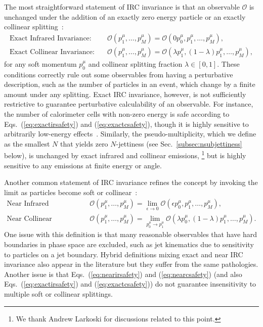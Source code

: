 \documentclass[letterpaper,11pt]{article}
\DeclareRobustCommand{\Sec}[1]{Sec.~\ref{#1}}
\DeclareRobustCommand{\Eqs}[2]{Eqs.~(\ref{#1}) and (\ref{#2})}
\begin{document}
The most straightforward statement of IRC invariance is that an observable $\mathcal O$ is unchanged under the addition of an exactly zero energy particle or an exactly collinear splitting~\cite{sterman1995handbook}:
%
\begin{align}
\label{eq:exactirsafety}\text{Exact Infrared Invariance:}&\quad \mathcal O(p_1^\mu, \ldots,p_M^\mu) =  \mathcal O(0 p_0^\mu, p_1^\mu,  \ldots, p_M^\mu),\\
\label{eq:exactcsafety}\text{Exact Collinear Invariance:}&\quad \mathcal O(p_1^\mu,  \ldots, p_M^\mu) = \mathcal O(\lambda p_1^\mu, (1-\lambda) p_1^\mu,\ldots, p_M^\mu),
\end{align}
for any soft momentum $p_0^\mu$ and collinear splitting fraction $\lambda\in[0,1]$.
%
These conditions correctly rule out some observables from having a perturbative description, such as the number of particles in an event, which change by a finite amount under any splitting.
%
Exact IRC invariance, however, is not sufficiently restrictive to guarantee perturbative calculability of an observable.
%
For instance, the number of calorimeter cells with non-zero energy is safe according to \Eqs{eq:exactirsafety}{eq:exactcsafety}, though it is highly sensitive to arbitrarily low-energy effects~\cite{Pumplin:1991kc}.
%
Similarly, the pseudo-multiplicity, which we define as the smallest $N$ that yields zero $N$-jettiness (see \Sec{subsec:nsubjettiness} below), is unchanged by exact infrared and collinear emissions,%
%
\footnote{We thank Andrew Larkoski for discussions related to this point.}
% 
but is highly sensitive to any emissions at finite energy or angle.


Another common statement of IRC invariance refines the concept by invoking the limit as particles become soft or collinear~\cite{Sterman:1978bi,Sterman:1978bj,Weinberg:1995mt,Banfi:2004yd}:
\begin{align}
\label{eq:nearirsafety}\text{Near Infrared Invariance:}&\quad \mathcal O(p_1^\mu, \ldots,p_M^\mu) =  \lim_{\epsilon\to0}\mathcal O(\epsilon p_0^\mu, p_1^\mu,  \ldots, p_M^\mu),\\
\label{eq:nearcsafety}\text{Near Collinear Invariance:}&\quad \mathcal O(p_1^\mu, \ldots, p_M^\mu) = \lim_{p_0^\mu\to p_1^\mu}\mathcal O(\lambda p_{0}^\mu, (1-\lambda) p_1^\mu, \ldots, p_M^\mu).
\end{align}
%
One issue with this definition is that many reasonable observables that have hard boundaries in phase space are excluded, such as jet kinematics due to sensitivity to particles on a jet boundary.
%
Hybrid definitions mixing exact and near IRC invariance also appear in the literature but they suffer from the same pathologies.
%
Another issue is that \Eqs{eq:nearirsafety}{eq:nearcsafety} (and also \Eqs{eq:exactirsafety}{eq:exactcsafety}) do not guarantee insensitivity to multiple soft or collinear splittings.
\end{document}
